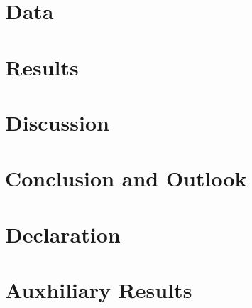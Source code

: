 \documentclass[12pt]{report}
\begin{document}
  \chapter{Data}
  \label{section:data}
  
  
  \chapter{Results}
  \label{section:results}
  
  
  \chapter{Discussion}
  \label{section:discussion}
  

  \chapter{Conclusion and Outlook}
  \label{section:conclusion_outlook}
  

  \chapter*{Declaration}
  

    

  \appendix
  \chapter{Auxhiliary Results}
  
\end{document}
